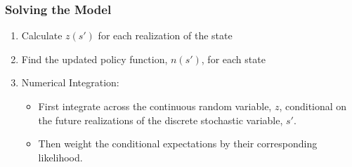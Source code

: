 \documentclass[11pt]{beamer}
\begin{document}
\begin{frame}\frametitle{Solving the Model}

\begin{enumerate}\setlength{\itemsep}{10pt}
  \item <1-|handout:1>Calculate $z(s')$ for each realization of the state
  \item <2-|handout:1>Find the updated policy function, $n(s')$, for each state
  \item <3-|handout:1>Numerical Integration:
  \begin{itemize}\setlength{\itemsep}{5pt}
    \item First integrate across the continuous random variable, $z$, conditional on the future realizations of the discrete stochastic variable, $s'$.%
    \item Then weight the conditional expectations by their corresponding likelihood. %
  \end{itemize}
\end{enumerate}

\end{frame}

\end{document}
